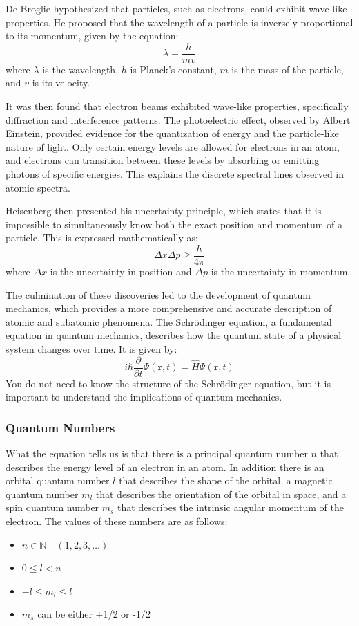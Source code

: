 De Broglie hypothesized that particles, such as electrons, could exhibit wave-like properties. He proposed that the wavelength of a particle is inversely proportional to its momentum, given by the equation:
\begin{equation}\label{eq:debroglie}
    \lambda = \frac{h}{mv}
\end{equation}
where $\lambda$ is the wavelength, $h$ is Planck's constant, $m$ is the mass of the particle, and $v$ is its velocity.

It was then found that electron beams exhibited wave-like properties, specifically diffraction and interference patterns. The photoelectric effect, observed by Albert Einstein, provided evidence for the quantization of energy and the particle-like nature of light. Only certain energy levels are allowed for electrons in an atom, and electrons can transition between these levels by absorbing or emitting photons of specific energies. This explains the discrete spectral lines observed in atomic spectra.

Heisenberg then presented his uncertainty principle, which states that it is impossible to simultaneously know both the exact position and momentum of a particle. This is expressed mathematically as:
\begin{equation}\label{eq:heisenberg}
    \Delta x \Delta p \geq \frac{h}{4\pi}
\end{equation}
where $\Delta x$ is the uncertainty in position and $\Delta p$ is the uncertainty in momentum. 

The culmination of these discoveries led to the development of quantum mechanics, which provides a more comprehensive and accurate description of atomic and subatomic phenomena. The Schrödinger equation, a fundamental equation in quantum mechanics, describes how the quantum state of a physical system changes over time. It is given by:
\begin{equation}\label{eq:schrodinger}
    i\hbar \frac{\partial}{\partial t} \Psi(\mathbf{r}, t) = \hat{H} \Psi(\mathbf{r}, t)
\end{equation}
You do not need to know the structure of the Schrödinger equation, but it is important to understand the implications of quantum mechanics.
\subsubsection{Quantum Numbers}
What the equation tells us is that there is a principal quantum number $n$ that describes the energy level of an electron in an atom. In addition there is an orbital quantum number $l$ that describes the shape of the orbital, a magnetic quantum number $m_l$ that describes the orientation of the orbital in space, and a spin quantum number $m_s$ that describes the intrinsic angular momentum of the electron. The values of these numbers are as follows:
\begin{itemize}
    \item $n\in\mathbb{N}\quad(1,2,3,\dots)$
    \item $0 \le l < n$
    \item $-l \le m_l \le l$
    \item $m_s$ can be either +1/2 or -1/2
\end{itemize}

